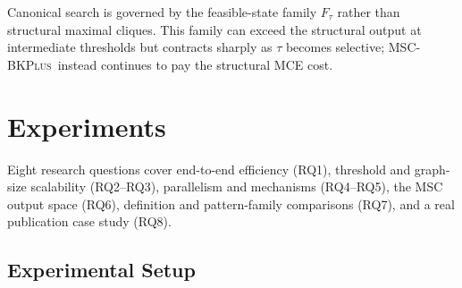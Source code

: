 \documentclass[sigconf, nonacm]{acmart}
\newcommand{\subEnum}{MSC-\textsc{BKPlus}}
\begin{document}
Canonical search is governed by the feasible-state family $F_\tau$ rather than
structural maximal cliques. This family can exceed the structural output at
intermediate thresholds but contracts sharply as $\tau$ becomes selective;
\subEnum\ instead continues to pay the structural MCE cost.
\section{Experiments}
\label{sec:exp}

Eight research questions cover end-to-end efficiency (RQ1), threshold and
graph-size scalability (RQ2--RQ3), parallelism and mechanisms (RQ4--RQ5), the
MSC output space (RQ6), definition and pattern-family comparisons (RQ7), and a
real publication case study (RQ8).

\subsection{Experimental Setup}
\label{sec:exp-setup}
\end{document}
